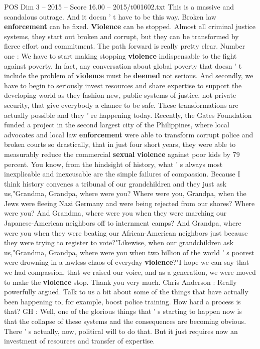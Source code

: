 \begin{textsample}{POS Dim 3 – 2015 – Score 16.00 – 2015/t001602.txt}
This is a massive and scandalous outrage.
And it doesn ' t have to be this way.
Broken law \textbf{enforcement} can be fixed. \textbf{Violence} can be stopped.
Almost all criminal justice systems, they start out broken and corrupt, but they can be transformed by fierce effort and commitment.
The path forward is really pretty clear.
Number one : We have to start making stopping \textbf{violence} indispensable to the fight against poverty.
In fact, any conversation about global poverty that doesn ' t include the problem of \textbf{violence} must be \textbf{deemed} not serious.
And secondly, we have to begin to seriously invest resources and share expertise to support the developing world as they fashion new, public systems of justice, not private security, that give everybody a chance to be safe.
These transformations are actually possible and they ' re happening today.
Recently, the Gates Foundation funded a project in the second largest city of the Philippines, where local advocates and local law \textbf{enforcement} were able to transform corrupt police and broken courts so drastically, that in just four short years, they were able to measurably reduce the commercial \textbf{sexual} \textbf{violence} against poor kids by 79 percent.
You know, from the hindsight of history, what ' s always most inexplicable and inexcusable are the simple failures of compassion.
Because I think history convenes a tribunal of our grandchildren and they just ask us,"Grandma, Grandpa, where were you?
Where were you, Grandpa, when the Jews were fleeing Nazi Germany and were being rejected from our shores?
Where were you?
And Grandma, where were you when they were marching our Japanese-American neighbors off to internment camps?
And Grandpa, where were you when they were beating our African-American neighbors just because they were trying to register to vote?"Likewise, when our grandchildren ask us,"Grandma, Grandpa, where were you when two billion of the world ' s poorest were drowning in a lawless chaos of everyday \textbf{violence}?"I hope we can say that we had compassion, that we raised our voice, and as a generation, we were moved to make the \textbf{violence} stop.
Thank you very much.
Chris Anderson : Really powerfully argued.
Talk to us a bit about some of the things that have actually been happening to, for example, boost police training.
How hard a process is that?
GH : Well, one of the glorious things that ' s starting to happen now is that the collapse of these systems and the consequences are becoming obvious.
There ' s actually, now, political will to do that.
But it just requires now an investment of resources and transfer of expertise.

\end{textsample}

